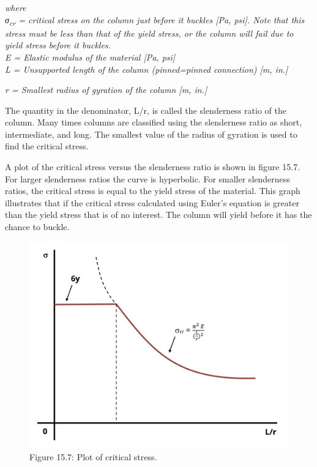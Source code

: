 \documentclass[
  letterpaper,
  DIV=11,
  numbers=noendperiod]{scrreprt}
\theoremstyle{definition}
\theoremstyle{remark}
\begin{document}
\emph{where}\\
\emph{σ\textsubscript{cr} = critical stress on the column just before it
buckles {[}Pa, psi{]}. Note that this stress must be less than that of
the yield stress, or the column will fail due to yield stress before it
buckles.}\\
\emph{E = Elastic modulus of the material {[}Pa, psi{]}}\\
\emph{L = Unsupported length of the column (pinned=pinned connection)
{[}m, in.{]}}

\emph{r = Smallest radius of gyration of the column {[}m, in.{]}}

The quantity in the denominator, L/r, is called the slenderness ratio of
the column. Many times columns are classified using the slenderness
ratio as short, intermediate, and long. The smallest value of the radius
of gyration is used to find the critical stress.

A plot of the critical stress versus the slenderness ratio is shown in
figure 15.7. For larger slenderness ratios the curve is hyperbolic. For
smaller slenderness ratios, the critical stress is equal to the yield
stress of the material. This graph illustrates that if the critical
stress calculated using Euler's equation is greater than the yield
stress that is of no interest. The column will yield before it has the
chance to buckle.

\begin{figure}[H]

{\centering \includegraphics{images/CH15s PNGs/figure 15.7.png}

}

\caption{Figure 15.7: Plot of critical stress.}

\end{figure}%
\end{document}
